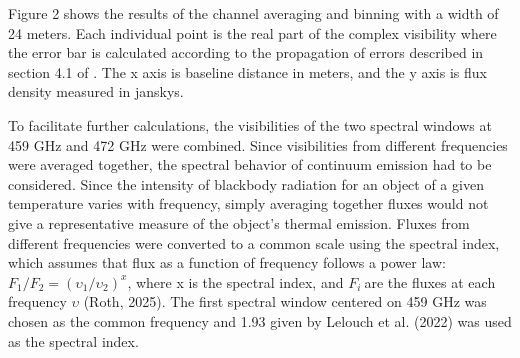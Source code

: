 Figure 2 shows the results of the channel averaging and binning with a width of 24 meters. Each individual point is the real part of the complex visibility where the error bar is calculated according to the propagation of errors described in section 4.1 of \cite{Nixon2020}.  The x axis is baseline distance in meters, and the y axis is flux density measured in janskys.

To facilitate further calculations, the visibilities of the two spectral windows at 459 GHz and 472 GHz were combined. Since visibilities from different frequencies were averaged together, the spectral behavior of continuum emission had to be considered. Since the intensity of blackbody radiation for an object of a given temperature varies with frequency, simply averaging together fluxes would not give a representative measure of the object's thermal emission. Fluxes from different frequencies were converted to a common scale using the spectral index, which assumes that flux as a function of frequency follows a power law: \(F_{1}/F_{2} = {(\upsilon_{1}/\upsilon_{2})}^{x}\), where x is the spectral index, and \(F_{i}\ \)are the fluxes at each frequency \(\upsilon\) (Roth, 2025). The first spectral window centered on 459 GHz was chosen as the common frequency and 1.93 given by Lelouch et al. (2022) was used as the spectral index.

